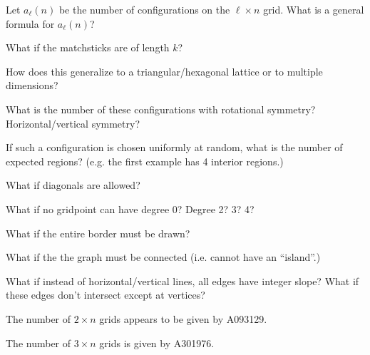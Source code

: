 \documentclass{article}
\begin{document}
  \begin{question}
    Let $a_\ell(n)$ be the number of configurations on the $\ell \times n$ grid.
    What is a general formula for $a_\ell(n)$?
  \end{question}

  \begin{related}
    \item What if the matchsticks are of length $k$?
    \item How does this generalize to a triangular/hexagonal lattice or to
      multiple dimensions?
    \item What is the number of these configurations with rotational symmetry?
      Horizontal/vertical symmetry?
    \item If such a configuration is chosen uniformly at random, what is the
      number of expected regions? (e.g. the first example has 4 interior
      regions.)
    \item What if diagonals are allowed?
    \item What if no gridpoint can have degree 0? Degree 2? 3? 4?
    \item What if the entire border must be drawn?
    \item What if the the graph must be connected (i.e. cannot have an ``island''.)
    \item What if instead of horizontal/vertical lines, all edges have integer
      slope? What if these edges don't intersect except at vertices?
  \end{related}
  \begin{references}
    \item The number of $2 \times n$ grids appears to be given by A093129.
    \item The number of $3 \times n$ grids is given by A301976.
  \end{references}
\end{document}
